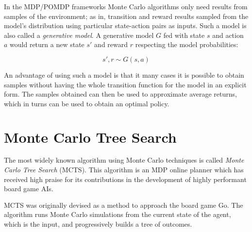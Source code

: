 In the MDP/POMDP frameworks Monte Carlo algorithms only need results from samples of the
environment; as in, transition and reward results sampled from the model's distribution using
particular state-action pairs as inputs. Such a model is also called a \textit{generative model}. A
generative model $G$ fed with state $s$ and action $a$ would return a new state $s'$ and reward $r$
respecting the model probabilities:

\[ s', r \sim G(s, a) \]

An advantage of using such a model is that it many cases it is possible to obtain samples without
having the whole transition function for the model in an explicit form. The samples obtained can
then be used to approximate average returns, which in turns can be used to obtain an optimal policy.

\section{Monte Carlo Tree Search}

The most widely known algorithm using Monte Carlo techniques is called \textit{Monte Carlo Tree
Search} (MCTS). This algorithm is an MDP online planner which has received high praise for its
contributions in the development of highly performant board game AIs.

MCTS was originally devised as a method to approach the board game Go. The algorithm runs Monte
Carlo simulations from the current state of the agent, which is the input, and progressively builds
a tree of outcomes.

